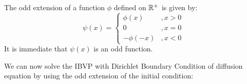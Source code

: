 \medskip 

\begin{defn} 
    The odd extension of a function $\phi$ defined on ${\mathbb R}^+$ is given by:
    \[\psi(x) = 
        \begin{cases}
            \phi(x) &, x > 0 \\
            0 &, x = 0 \\
            -\phi(-x) &, x < 0
        \end{cases}\]
    It is immediate that $\psi(x)$ is an odd function.
\end{defn}

We can now solve the IBVP with Dirichlet Boundary Condition of diffusion equation by using the odd extension of the initial condition:

\medskip 

